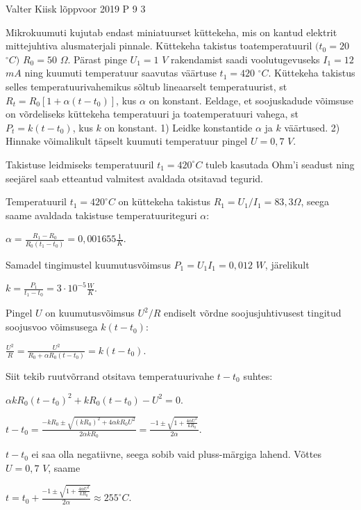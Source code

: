 {Valter Kiisk} %
{lõppvoor} %
{2019} %
{P 9} %
{3} %
{

\ifStatement
Mikrokuumuti kujutab endast miniatuurset küttekeha, mis on kantud elektrit mittejuhtiva alusmaterjali pinnale. Küttekeha takistus toatemperatuuril $(t_0 = 20$ $^{\circ}C)$ $R_0 = 50$ $\Omega$. Pärast pinge $U_1 = 1$ $V$ rakendamist saadi voolutugevuseks $I_1 = 12$ $mA$ ning kuumuti temperatuur saavutas väärtuse $t_1 = 420$ $^{\circ}C$. Küttekeha takistus selles temperatuurivahemikus sõltub lineaarselt temperatuurist, st $R_t = R_0 [1 + \alpha (t - t_0)]$, kus $\alpha$ on konstant. Eeldage, et soojuskadude võimsuse on võrdeliseks küttekeha temperatuuri ja toatemperatuuri vahega, st $P_t = k(t - t_0)$, kus $k$ on konstant. 
1) Leidke konstantide $\alpha$ ja $k$ väärtused. 
2) Hinnake võimalikult täpselt kuumuti temperatuur pingel $U = 0,7$ $V$.
\fi

\ifHint
Takistuse leidmiseks temperatuuril $t_1 = 420 ^{\circ}C$ tuleb kasutada Ohm'i seadust ning seejärel saab etteantud valmitest avaldada otsitavad tegurid.
\fi

\ifSolution
Temperatuuril $t_1 = 420 ^{\circ}C$ on küttekeha takistus $R_1 = U_1 / I_1 = 83,3 \Omega$, seega saame avaldada takistuse temperatuuriteguri $\alpha$:
\begin{center}
$\alpha = \frac{R_1 - R_0}{R_0(t_1 - t_0)} = 0,001 655 \frac{1}{K}$.
\end{center}
Samadel tingimustel kuumutusvõimsus $P_1 = U_1 I_1 = 0,012$ $W$, järelikult
\begin{center}
$k = \frac{P_1}{t_1 - t_0} = 3 \cdot 10 ^{-5} \frac{W}{K}$.
\end{center}
Pingel $U$ on kuumutusvõimsus $U^2 / R$ endiselt võrdne soojusjuhtivusest tingitud soojusvoo võimsusega $k(t - t_0)$:
\begin{center}
$\frac{U^2}{R} = \frac{U^2}{R_0 + \alpha R_0(t - t_0)} = k(t - t_0)$.
\end{center}
Siit tekib ruutvõrrand otsitava temperatuurivahe $t - t_0$ suhtes:
\begin{center}
$\alpha k R_0 (t - t_0)^2 + k R_0(t - t_0) - U^2 = 0$.
\end{center}
\begin{center}
$t - t_0 = \frac{- k R_0 \pm \sqrt{(k R_0)^2 + 4 \alpha k R_0 U^2}}{2 \alpha k R_0} = \frac{-1 \pm \sqrt{1 + \frac{4 \alpha U^2}{k R_0}}}{2 \alpha}$.
\end{center}
$t - t_0$ ei saa olla negatiivne, seega sobib vaid pluss-märgiga lahend. Võttes $U = 0,7$ $V$, saame
\begin{center}
$t = t_0 + \frac{-1 \pm \sqrt{1 + \frac{4 \alpha U^2}{k R_0}}}{2 \alpha} \approx 255 ^{\circ}C$.
\end{center}
\fi
}
